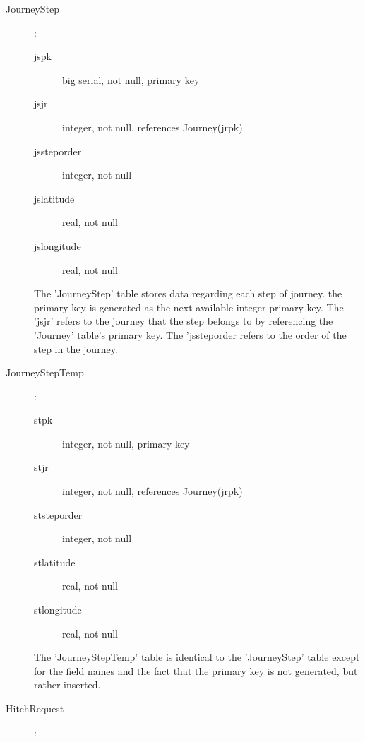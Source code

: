 \documentclass[11pt]{article}
\begin{document}
\begin{description}
\item[Journey\textunderscore Step]:

	\begin{description}
	\item[js\textunderscore pk] big serial, not null, primary key
	\item[js\textunderscore jr] integer, not null, references Journey(jr\textunderscore pk)
	\item[js\textunderscore step\textunderscore order] integer, not null
	\item[js\textunderscore latitude] real, not null
	\item[js\textunderscore longitude] real, not null
	\end{description}
	
The 'Journey\textunderscore Step' table stores data regarding each step of journey. the primary key is generated as the next available integer primary key. The 'js\textunderscore jr' refers to the journey that the step belongs to by referencing the 'Journey' table's primary key. The 'js\textunderscore step\textunderscore order refers to the order of the step in the journey.

\item[Journey\textunderscore Step\textunderscore Temp]:

	\begin{description}
	\item[st\textunderscore pk] integer, not null, primary key
	\item[st\textunderscore jr] integer, not null, references Journey(jr\textunderscore pk)
	\item[st\textunderscore step\textunderscore order] integer, not null
	\item[st\textunderscore latitude] real, not null
	\item[st\textunderscore longitude] real, not null
	\end{description}
	
The 'Journey\textunderscore Step\textunderscore Temp' table is identical to the 'Journey\textunderscore Step' table except for the field names and the fact that the primary key is not generated, but rather inserted.
	
\item[Hitch\textunderscore Request]:


\end{description}
\end{document}

